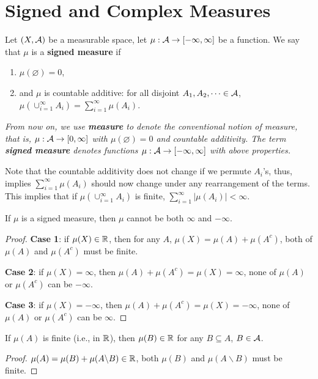 \documentclass[11pt]{article}
\begin{document}
	\section{Signed and Complex Measures}
	\begin{definition}
		Let $(X, \mathcal{{A}})$ be a measurable space, let $\mu: \mathcal{{A}} \to [-\infty, \infty]$ be a function. We say that $\mu$ is a \textbf{signed measure} if
		\begin{enumerate}
			\item $\mu(\varnothing) = 0$,
			\item and $\mu$ is countable additive: for all disjoint $A_1, A_2, \dots \in \mathcal{{A}}$, $\mu(\cup_{i=1}^\infty A_i) = \sum_{i=1}^\infty \mu(A_i)$.
		\end{enumerate}
	\end{definition}
	\emph{From now on, we use \textbf{measure} to denote the conventional notion of measure, that is, $\mu: \mathcal{{A}} \to [0, \infty]$ with $\mu(\varnothing) = 0$ and countable additivity. The term \textbf{signed measure} denotes functions $\mu: \mathcal{{A}} \to [-\infty, \infty]$ with above properties.}
	\begin{remark}
		Note that the countable additivity does not change if we permute $A_i$'s, thus, implies $\sum_{i=1}^\infty \mu(A_i)$ should now change under any rearrangement of the terms. This implies that if $\mu(\cup_{i=1}^\infty A_i)$ is finite, $\sum_{i=1}^\infty |\mu(A_i)| < \infty$.
	\end{remark}
	
	\begin{proposition}
		If $\mu$ is a signed measure, then $\mu$ cannot be both $\infty$ and $-\infty$.
		\begin{proof}
			\textbf{Case 1}: if $\mu(X) \in \mathbb{R}$, then for any $A$, $\mu(X) = \mu(A) + \mu(A^c)$, both of $\mu(A)$ and $\mu(A^c)$ must be finite. 
			
			\textbf{Case 2}: if $\mu(X) = \infty$, then $\mu(A) + \mu(A^c) = \mu(X) = \infty$, none of $\mu(A)$ or $\mu(A^c)$ can be $-\infty$.
			
			\textbf{Case 3}: if $\mu(X) = - \infty$, then $\mu(A) + \mu(A^c) = \mu(X) = - \infty$, none of $\mu(A)$ or $\mu(A^c)$ can be $\infty$. 
		\end{proof}
	\end{proposition}
	
	\begin{proposition}
		If $\mu(A)$ is finite (i.e., in $\mathbb{R}$), then $\mu(B) \in \mathbb{R}$ for any $B \subseteq A$, $B \in \mathcal{{A}}$.
		\begin{proof}
			$\mu(A) = \mu(B) + \mu(A \backslash B) \in \mathbb{R}$, both $\mu(B)$ and $\mu(A \backslash B)$ must be finite.
		\end{proof}
	\end{proposition}
\end{document}
